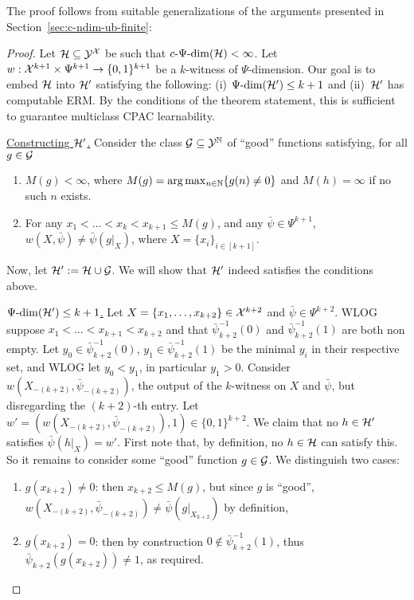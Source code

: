 \documentclass[11pt]{article}
\begin{document}
The proof follows from suitable generalizations of the arguments presented in Section~\ref{sec:c-ndim-ub-finite}: 

\begin{proof}
    Let $\mathcal{H}\subseteq\mathcal{Y}^{\mathcal{X}}$ be such that $c\text{-}\Psi\text{-}\mathrm{dim}(\mathcal{H})<\infty$.
    Let $w:\mathcal{X}^{k+1}\times\Psi^{k+1}\rightarrow\{0,1\}^{k+1}$ be a $k$-witness of $\Psi$-dimension.
    Our goal is to embed $\mathcal{H}$ into $\mathcal{H}'$ satisfying the following: (i) $\Psi\text{-}\mathrm{dim}(\mathcal{H}')\leq k+1$ and (ii)~$\mathcal{H}'$ has computable ERM. 
    By the conditions of the theorem statement, this is sufficient to guarantee multiclass CPAC learnability.

    \underline{Constructing $\mathcal{H}'$.} 
    Consider the class $\mathcal{G}\subseteq\mathcal{Y}^{\mathbb{N}}$ of ``good'' functions satisfying, for all $g\in\mathcal{G}$
    \begin{enumerate}
        \item $ M(g)<\infty$, where $M(g)=\arg\max_{n\in\mathbb{N}}\{ g(n)\neq0 \}$ and $M(h)=\infty$ if no such $n$ exists.
        \item For any $x_1<\dots<x_k<x_{k+1}\leq M(g)$, and any $\bar{\psi}\in\Psi^{k+1}$, $w(X,\bar{\psi})\neq\bar{\psi}(g|_X)$, where $X=\{x_i\}_{i\in[k+1]}$.
    \end{enumerate}
    Now, let $\mathcal{H}':=\mathcal{H}\cup\mathcal{G}$. We will show that $\mathcal{H}'$ indeed satisfies the conditions above.

    \underline{$\Psi\text{-}\mathrm{dim}(\mathcal{H}')\leq k+1$.}
    Let $X=\{x_1,\dots,x_{k+2}\}\in\mathcal{X}^{k+2}$ and $\bar{\psi}\in\Psi^{k+2}$. 
    WLOG suppose $x_1<\dots<x_{k+1}<x_{k+2}$ and that $\bar{\psi}_{k+2}^{-1}(0)$ and $\bar{\psi}_{k+2}^{-1}(1)$ are both non empty. 
    Let $y_0\in \bar{\psi}_{k+2}^{-1}(0)$, $y_1\in \bar{\psi}_{k+2}^{-1}(1)$ be the minimal $y_i$ in their respective set, and WLOG let $y_0<y_1$, in particular $y_1 >0$.
    Consider $w(X_{-(k+2)},\bar{\psi}_{-(k+2)})$, the output of the $k$-witness on $X$ and $\bar{\psi}$, but disregarding the $(k+2)$-th entry.
    Let $w'=(w(X_{-(k+2)},\bar{\psi}_{-(k+2)}),1)\in\{0,1\}^{k+2}$.
    We claim that no $h\in\mathcal{H}'$ satisfies $\bar{\psi}(h|_X)=w'$.
    First note that, by definition, no $h\in\mathcal{H}$ can satisfy this.
    So it remains to consider some ``good'' function $g\in\mathcal{G}$.
    We distinguish two cases:
    \begin{enumerate}
        \item $g(x_{k+2})\neq 0$: then $x_{k+2}\leq M(g)$, but since $g$ is ``good'', $w(X_{-(k+2)},\bar{\psi}_{-(k+2)})\neq\bar{\psi}(g|_{X_{k+2}})$ by definition,
        \item $g(x_{k+2})= 0$: then by construction $0\notin\bar{\psi}_{k+2}^{-1}(1)$, thus  $\bar{\psi}_{k+2}(g(x_{k+2}))\neq 1$, as required.
    \end{enumerate}


\end{proof}
\end{document}
